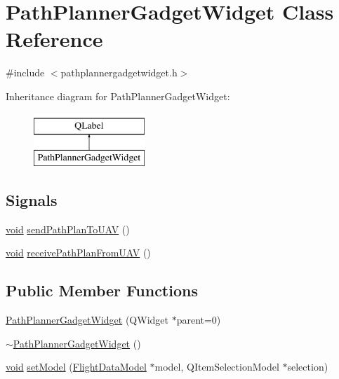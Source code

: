 \hypertarget{class_path_planner_gadget_widget}{\section{Path\-Planner\-Gadget\-Widget Class Reference}
\label{class_path_planner_gadget_widget}
}


{\ttfamily \#include $<$pathplannergadgetwidget.\-h$>$}

Inheritance diagram for Path\-Planner\-Gadget\-Widget\-:\begin{figure}[H]
\begin{center}
\leavevmode
\includegraphics[height=2.000000cm]{class_path_planner_gadget_widget}
\end{center}
\end{figure}
\subsection*{Signals}
\begin{DoxyCompactItemize}
\item 
\hyperlink{group___u_a_v_objects_plugin_ga444cf2ff3f0ecbe028adce838d373f5c}{void} \hyperlink{group___path_planner_gadget_plugin_ga65ade0264344b0cf65707fda3419f091}{send\-Path\-Plan\-To\-U\-A\-V} ()
\item 
\hyperlink{group___u_a_v_objects_plugin_ga444cf2ff3f0ecbe028adce838d373f5c}{void} \hyperlink{group___path_planner_gadget_plugin_ga4da1c30707d66e4e343263500573eb39}{receive\-Path\-Plan\-From\-U\-A\-V} ()
\end{DoxyCompactItemize}
\subsection*{Public Member Functions}
\begin{DoxyCompactItemize}
\item 
\hyperlink{group___path_planner_gadget_plugin_gaa5a16b8b25c368ba63764246fe417001}{Path\-Planner\-Gadget\-Widget} (Q\-Widget $\ast$parent=0)
\item 
\hyperlink{group___path_planner_gadget_plugin_ga7a9758a518eef6a55f9386ed8a552e29}{$\sim$\-Path\-Planner\-Gadget\-Widget} ()
\item 
\hyperlink{group___u_a_v_objects_plugin_ga444cf2ff3f0ecbe028adce838d373f5c}{void} \hyperlink{group___path_planner_gadget_plugin_ga906747f7512d66ab544506fdd8ba5fc2}{set\-Model} (\hyperlink{class_flight_data_model}{Flight\-Data\-Model} $\ast$model, Q\-Item\-Selection\-Model $\ast$selection)
\end{DoxyCompactItemize}


